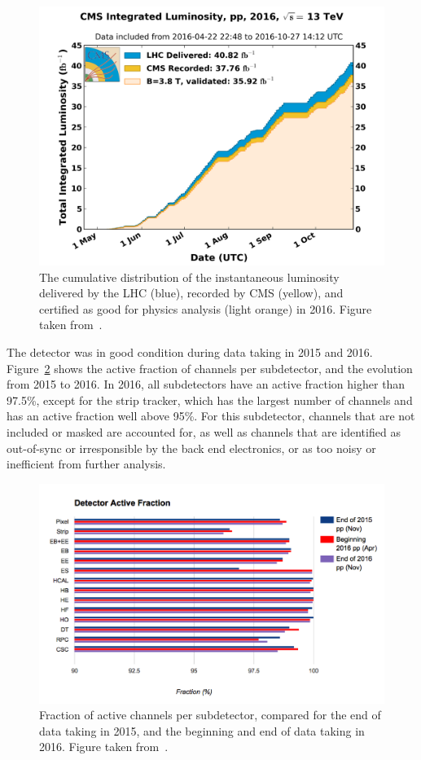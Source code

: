 \begin{figure}[ht]
  \centering
 \includegraphics[width=.75\textwidth]{lumi}
 \caption{The cumulative distribution of the instantaneous luminosity delivered by the \ac{LHC} (blue), recorded by \ac{CMS} (yellow), and certified as good for physics analysis (light orange) in 2016. Figure taken from~\cite{twiki:lumi}.}
 \label{fig:CMSlumi}
\end{figure}

The detector was in good condition during data taking in 2015 and 2016. Figure~\ref{fig:activechannels} shows the active fraction of channels per subdetector, and the evolution from 2015 to 2016. In 2016, all subdetectors have an active fraction higher than 97.5\%, except for the strip tracker, which has the largest number of channels and has an active fraction well above 95\%. For this subdetector, channels that are not included or masked are accounted for, as well as channels that are identified as out-of-sync or irresponsible by the back end electronics, or as too noisy or inefficient from further analysis.

\begin{figure}[ht]
  \centering
 \includegraphics[width=\textwidth]{activefraction}
 \caption{Fraction of active channels per subdetector, compared for the end of data taking in 2015, and the beginning  and end of data taking in 2016. Figure taken from~\cite{twiki:active}.}
 \label{fig:activechannels}
\end{figure}


